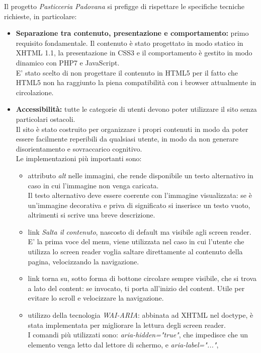 Il progetto \emph{Pasticceria Padovana} si prefigge di rispettare le specifiche tecniche richieste, in particolare:
\begin{itemize}
	\item \textbf{Separazione tra contenuto, presentazione e comportamento:} primo requisito fondamentale. 
	Il contenuto è stato progettato in modo statico in XHTML 1.1, la presentazione in CSS3 e il comportamento è gestito in modo dinamico con PHP7 e JavaScript.\\
	E' stato scelto di non progettare il contenuto in HTML5 per il fatto che HTML5 non ha raggiunto la piena compatibilità con i browser attualmente in circolazione.\\
	\item \textbf{Accessibilità:} tutte le categorie di utenti devono poter utilizzare il sito senza particolari ostacoli.\\ 
	Il sito è stato costruito per organizzare i propri contenuti in modo da poter essere facilmente reperibili da qualsiasi utente, 
	in modo da non generare disorientamento e sovraccarico cognitivo.\\ 
	Le implementazioni più importanti sono:
	\begin{itemize}
		\item attributo \emph{alt} nelle immagini, che rende disponibile un testo alternativo in caso in cui l'immagine non venga caricata.\\ 
		Il testo alternativo deve essere coerente con l'immagine visualizzata: se è un'immagine decorativa e priva di significato si inserisce un testo vuoto, 
		altrimenti si scrive una breve descrizione.
		\item link \emph{Salta il contenuto}, nascosto di default ma visibile agli screen reader. E' la prima voce del menu, viene utilizzata nel caso in cui l'utente che
		utilizza lo screen reader voglia saltare direttamente al contenuto della pagina, velocizzando la navigazione.
		\item link {torna su}, sotto forma di bottone circolare sempre visibile, che si trova a lato del content: se invocato, ti porta all'inizio del content. 
		Utile per evitare lo scroll e velocizzare la navigazione.
		\item utilizzo della tecnologia \emph{WAI-ARIA}: abbinata ad XHTML nel doctype, è stata implementata per migliorare la lettura degli screen reader.\\
		I comandi più utilizzati sono: \emph{aria-hidden="true"}, che impedisce che un elemento venga letto dal lettore di schermo, e \emph{aria-label="..."}, 

\end{itemize}
\end{itemize}
